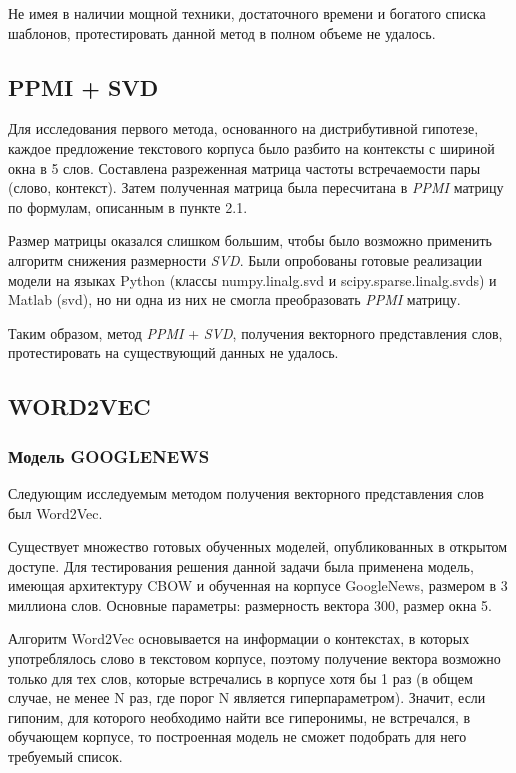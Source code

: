 Не имея в наличии мощной техники, достаточного времени и богатого списка
шаблонов, протестировать данной метод в полном объеме не удалось.





\subsection{PPMI + SVD}

Для исследования первого метода, основанного на дистрибутивной гипотезе, каждое
предложение текстового корпуса было разбито на контексты с шириной окна в 5 слов.
Составлена разреженная матрица частоты встречаемости пары (слово, контекст). Затем
полученная матрица была пересчитана в \textit{PPMI} матрицу по формулам, описанным в пункте
2.1.

Размер матрицы оказался слишком большим, чтобы было возможно применить алгоритм
снижения размерности \textit{SVD}. Были опробованы готовые реализации модели на языках
Python (классы numpy.linalg.svd и scipy.sparse.linalg.svds) и Matlab (svd), но ни одна из них не смогла преобразовать \textit{PPMI} матрицу.

Таким образом, метод \textit{PPMI} + \textit{SVD}, получения векторного представления слов,
протестировать на существующий данных не удалось.





\subsection{WORD2VEC}

\subsubsection{Модель GOOGLENEWS}

Следующим исследуемым методом получения векторного представления слов был
Word2Vec.

Существует множество готовых обученных моделей, опубликованных в открытом доступе.
Для тестирования решения данной задачи была применена модель, имеющая архитектуру
CBOW и обученная на корпусе GoogleNews, размером в 3 миллиона слов. Основные
параметры: размерность вектора 300, размер окна 5.

Алгоритм Word2Vec основывается на информации о контекстах, в которых употреблялось
слово в текстовом корпусе, поэтому получение вектора возможно только для тех слов,
которые встречались в корпусе хотя бы 1 раз (в общем случае, не менее N раз, где порог N
является гиперпараметром). Значит, если гипоним, для которого необходимо найти все
гиперонимы, не встречался, в обучающем корпусе, то построенная модель не сможет
подобрать для него требуемый список.


